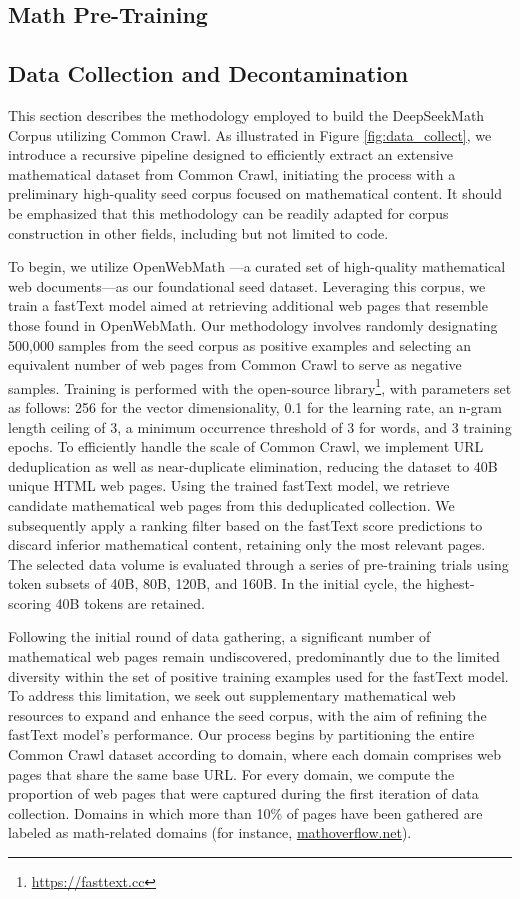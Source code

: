 \begin{itemize}[topsep=0pt]
\section{Math Pre-Training}

\subsection{Data Collection and Decontamination} This section describes the methodology employed to build the DeepSeekMath Corpus utilizing Common Crawl. As illustrated in Figure \ref{fig:data_collect}, we introduce a recursive pipeline designed to efficiently extract an extensive mathematical dataset from Common Crawl, initiating the process with a preliminary high-quality seed corpus focused on mathematical content. It should be emphasized that this methodology can be readily adapted for corpus construction in other fields, including but not limited to code.

To begin, we utilize OpenWebMath \citep{openwebmath}—a curated set of high-quality mathematical web documents—as our foundational seed dataset. Leveraging this corpus, we train a fastText model \citep{joulin2016fasttext} aimed at retrieving additional web pages that resemble those found in OpenWebMath. Our methodology involves randomly designating 500,000 samples from the seed corpus as positive examples and selecting an equivalent number of web pages from Common Crawl to serve as negative samples. Training is performed with the open-source library\footnote{\url{https://fasttext.cc}}, with parameters set as follows: 256 for the vector dimensionality, 0.1 for the learning rate, an n-gram length ceiling of 3, a minimum occurrence threshold of 3 for words, and 3 training epochs. To efficiently handle the scale of Common Crawl, we implement URL deduplication as well as near-duplicate elimination, reducing the dataset to 40B unique HTML web pages. Using the trained fastText model, we retrieve candidate mathematical web pages from this deduplicated collection. We subsequently apply a ranking filter based on the fastText score predictions to discard inferior mathematical content, retaining only the most relevant pages. The selected data volume is evaluated through a series of pre-training trials using token subsets of 40B, 80B, 120B, and 160B. In the initial cycle, the highest-scoring 40B tokens are retained.

Following the initial round of data gathering, a significant number of mathematical web pages remain undiscovered, predominantly due to the limited diversity within the set of positive training examples used for the fastText model. To address this limitation, we seek out supplementary mathematical web resources to expand and enhance the seed corpus, with the aim of refining the fastText model’s performance. Our process begins by partitioning the entire Common Crawl dataset according to domain, where each domain comprises web pages that share the same base URL. For every domain, we compute the proportion of web pages that were captured during the first iteration of data collection. Domains in which more than 10\% of pages have been gathered are labeled as math-related domains (for instance, \url{mathoverflow.net}). 


\end{itemize}
